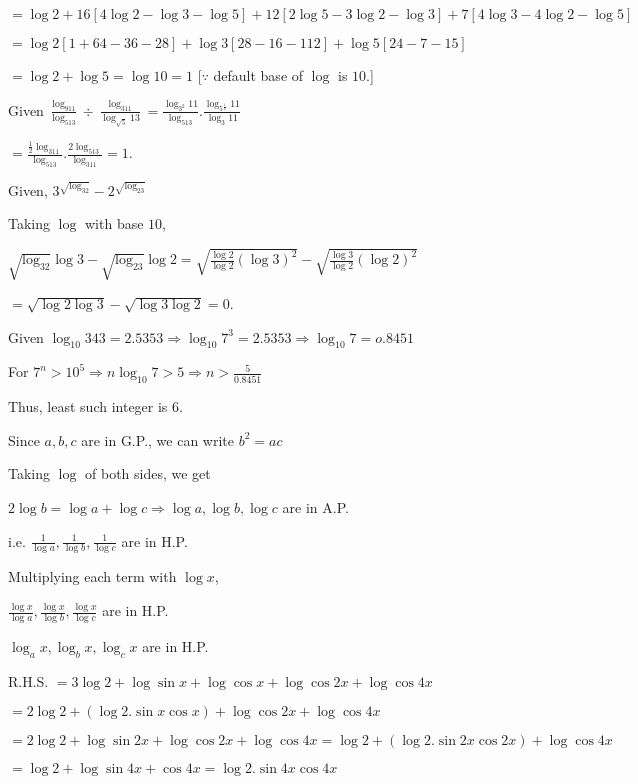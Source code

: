   $= \log 2 + 16[4\log 2 - \log 3 - \log 5] + 12[2\log 5 - 3\log 2 - \log 3] + 7[4\log 3 - 4\log 2 - \log 5]$

  $= \log 2[1 + 64 - 36 - 28] + \log 3[28 - 16 -1 12] + \log 5[24 - 7 - 15]$

  $= \log 2 + \log 5 = \log 10 = 1$ [$\because$ default base of $\log$ is $10$.]
\item Given $\frac{\log_911}{\log_513}\div\frac{\log_311}{\log_{\sqrt{5}}13} =
  \frac{\log_{3^2}11}{\log_513}.\frac{\log_{5^{\tfrac{1}{2}}}11}{\log_3 11}$

  $= \frac{\tfrac{1}{2}\log_311}{\log_513}.\frac{2\log_513}{\log_311} = 1$.
\item Given, $3^{\sqrt{\log_32}} - 2^{\sqrt{\log_23}}$

  Taking $\log$ with base $10$,

  $\sqrt{\log_32}\log 3 - \sqrt{\log_23}\log 2 = \sqrt{\frac{\log 2}{\log 2}(\log 3)^2} - \sqrt{\frac{\log 3}{\log 2}(\log 2)^2}$

  $= \sqrt{\log 2\log 3} - \sqrt{\log 3\log 2} = 0$.
\item Given $\log_{10}343 = 2.5353 \Rightarrow \log_{10}7^3 = 2.5353 \Rightarrow \log_{10}7 = o.8451$

  For $7^n > 10^5 \Rightarrow n\log_{10}7 > 5 \Rightarrow n > \frac{5}{0.8451}$

  Thus, least such integer is $6$.
\item Since $a, b, c$ are in G.P., we can write $b^2 = ac$

  Taking $\log$ of both sides, we get

  $2\log b = \log a + \log c \Rightarrow \log a, \log b, \log c$ are in A.P.

  i.e. $\frac{1}{\log a}, \frac{1}{\log b}, \frac{1}{\log c}$ are in H.P.

  Multiplying each term with $\log x$,

  $\frac{\log x}{\log a}, \frac{\log x}{\log b}, \frac{\log x}{\log c}$ are in H.P.

  $\log_ax, \log_bx, \log_cx$ are in H.P.
\item R.H.S. $= 3\log2 + \log\sin x + \log\cos x + \log\cos2x + \log\cos4x$

  $= 2\log 2 + (\log 2.\sin x\cos x) + \log\cos2x + \log\cos4x$

  $= 2\log 2 + \log\sin2x + \log\cos2x + \log\cos4x = \log 2 + (\log 2.\sin2x\cos2x) + \log\cos4x$

  $= \log 2 + \log\sin4x + \cos4x = \log 2.\sin4x\cos4x$

